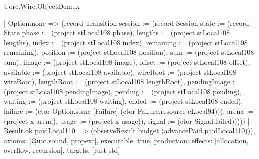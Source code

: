 \begin{lexlean}{Uorc.Wire.ObjectDemux}
\begin{semanticmodule}
{        | Option.none => (record Transition {session := (record Session {state := (record State {phase := (project stLocal108 phase), lengths := (project stLocal108 lengths), index := (project stLocal108 index), remaining := (project stLocal108 remaining), position := (project stLocal108 position), sum := (project stLocal108 sum), image := (project stLocal108 image), offset := (project stLocal108 offset), available := (project stLocal108 available), wireRoot := (project stLocal108 wireRoot), lengthRoot := (project stLocal108 lengthRoot), pendingImage := (project stLocal108 pendingImage), pending := (project stLocal108 pending), waiting := (project stLocal108 waiting), ended := (project stLocal108 ended), failure := (ctor Option.some [Failure] (ctor Failure.resource eLocal94))}), arena := (project x arena), usage := (project x usage)}), signal := (ctor Signal.failed)}))))
    | Result.ok paidLocal110 => (observeResult budget (advancePaid paidLocal110))),
  axioms: [Quot.sound, propext],
  executable: true,
  production: {effects: [allocation, overflow, recursion], targets: [rust-std]}
}


\end{semanticmodule}
\end{lexlean}
